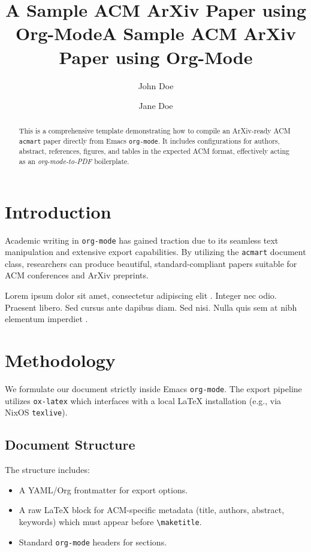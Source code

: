 \documentclass[sigconf, authordraft, nonacm]{acmart}
\date{}
\title{A Sample ACM ArXiv Paper using Org-Mode}
\begin{document}
\title{A Sample ACM ArXiv Paper using Org-Mode}

\author{John Doe}

\author{Jane Doe}

\renewcommand{\shortauthors}{Doe and Doe}

\begin{abstract}
This is a comprehensive template demonstrating how to compile an ArXiv-ready ACM \texttt{acmart} paper directly from Emacs \texttt{org-mode}. It includes configurations for authors, abstract, references, figures, and tables in the expected ACM format, effectively acting as an \textit{org-mode-to-PDF} boilerplate.
\end{abstract}


\maketitle
\section{Introduction}
\label{sec:org3e3326b}
Academic writing in \texttt{org-mode} has gained traction due to its seamless text manipulation and extensive export capabilities. By utilizing the \texttt{acmart} document class, researchers can produce beautiful, standard-compliant papers suitable for ACM conferences and ArXiv preprints.

Lorem ipsum dolor sit amet, consectetur adipiscing elit \cite{knuth1984}. Integer nec odio. Praesent libero. Sed cursus ante dapibus diam. Sed nisi. Nulla quis sem at nibh elementum imperdiet \cite{lamport1994}.
\section{Methodology}
\label{sec:org9c2f01e}
We formulate our document strictly inside Emacs \texttt{org-mode}. The export pipeline utilizes \texttt{ox-latex} which interfaces with a local \LaTeX{} installation (e.g., via NixOS \texttt{texlive}). 
\subsection{Document Structure}
\label{sec:org6f55371}
The structure includes:
\begin{itemize}
\item A YAML/Org frontmatter for export options.
\item A raw \LaTeX{} block for ACM-specific metadata (title, authors, abstract, keywords) which must appear before \verb|\maketitle|.
\item Standard \texttt{org-mode} headers for sections.
\end{itemize}
\end{document}
